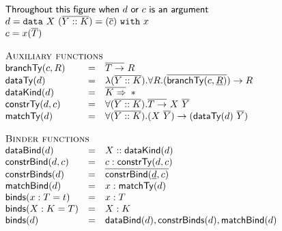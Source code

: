 \newcommand{\gammaterm}{\Gamma^{\textrm{term}}}
\newcommand{\gammatype}{\Gamma^{\textrm{type}}}
\newcommand{\gammadata}{\Gamma^{\textrm{data}}}
\newcommand{\gammarhs}{\Gamma^{\textrm{rhs}}}
\newcommand{\gammanew}{\Gamma^{\prime}}
\newcommand{\gammadatarhs}[1]{\Gamma_{#1}}

\newcommand{\maxTerm}{n}
\newcommand{\maxType}{m}
\newcommand{\maxData}{o}
\newcommand{\maxArg}{k}
\newcommand{\maxConstr}{l}

\begin{figure}[!t]
  \centering
  \begin{displaymath}
  \begin{array}{lll}
  \multicolumn{3}{l}{\textsf{Throughout this figure when $d$ or $c$ is an argument}}\\
  \multicolumn{3}{l}{d = \datatype{X}{(\seq{Y :: K})}{x}{(\seq{c})}} \\
  \multicolumn{3}{l}{c = x(\seq{T})}\\
  \\
  \multicolumn{3}{l}{\textsc{Auxiliary functions}}\\
  \branchTy{c}{R}
  &=& \seqFunArr{T}{R} \\
  \scottTy{d}
  &=& \lambda (\seq{Y::K}) . \forall R . (\seq{\branchTy{c}{\fixed{R}}}) \rightarrow R  \\
  \dataKind{d}
  &=& \seqKindArr{K}{\Type} \\
  \constrTy{d}{c}
  &=& \forall (\seq{Y::K}). \seqFunArr{T}{X\ \seq{Y}}\\
  \matchTy{d}
  &=& \forall (\seq{Y::K}) . (X\ \seq{Y}) \rightarrow (\scottTy{d}\ \seq{Y})\\
  \\
  \multicolumn{3}{l}{\textsc{Binder functions}}\\
  \dataBind{d}
  &=& X :: \dataKind{d}\\
  \constrBind{d}{c}
  &=& c : \constrTy{d}{c}\\
  \constrBinds{d}
  &=& \seq{\constrBind{\fixed{d}}{c}}\\
  \matchBind{d}
  &=& x : \matchTy{d}\\
  \binds{x : T = t}&=&x:T\\
  \binds{X : K = T}&=&X:K\\
  \binds{d}&=& \dataBind{d}, \constrBinds{d}, \matchBind{d}\\
  \end{array}
  \end{displaymath}
  \label{fig:fir_aux}
\end{figure}

